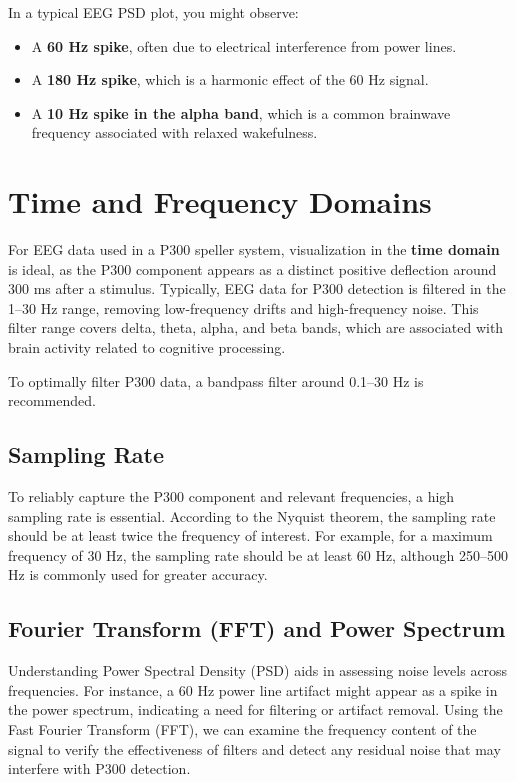 \documentclass{article}
\begin{document}
In a typical EEG PSD plot, you might observe:
\begin{itemize}
    \item A \textbf{60 Hz spike}, often due to electrical interference from power lines.
    \item A \textbf{180 Hz spike}, which is a harmonic effect of the 60 Hz signal.
    \item A \textbf{10 Hz spike in the alpha band}, which is a common brainwave frequency associated with relaxed wakefulness.
\end{itemize}

\section{Time and Frequency Domains}
For EEG data used in a P300 speller system, visualization in the \textbf{time domain} is ideal, as the P300 component appears as a distinct positive deflection around 300 ms after a stimulus. Typically, EEG data for P300 detection is filtered in the 1–30 Hz range, removing low-frequency drifts and high-frequency noise. This filter range covers delta, theta, alpha, and beta bands, which are associated with brain activity related to cognitive processing.

To optimally filter P300 data, a bandpass filter around 0.1–30 Hz is recommended.

\subsection{Sampling Rate}
To reliably capture the P300 component and relevant frequencies, a high sampling rate is essential. According to the Nyquist theorem, the sampling rate should be at least twice the frequency of interest. For example, for a maximum frequency of 30 Hz, the sampling rate should be at least 60 Hz, although 250–500 Hz is commonly used for greater accuracy.

\subsection{Fourier Transform (FFT) and Power Spectrum}
Understanding Power Spectral Density (PSD) aids in assessing noise levels across frequencies. For instance, a 60 Hz power line artifact might appear as a spike in the power spectrum, indicating a need for filtering or artifact removal. Using the Fast Fourier Transform (FFT), we can examine the frequency content of the signal to verify the effectiveness of filters and detect any residual noise that may interfere with P300 detection.
\end{document}
